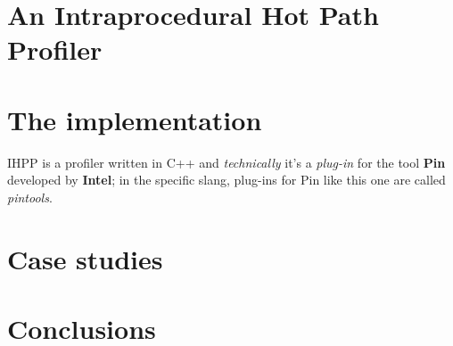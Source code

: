 \documentclass[a4paper,11pt]{report}
\begin{document}
\chapter{An Intraprocedural Hot Path Profiler}

\chapter{The implementation}

IHPP is a profiler written in C++ and \emph{technically} it's a \emph{plug-in}
for the tool \textbf{Pin} developed by \textbf{Intel}; in the specific slang,
plug-ins for Pin like this one are called \emph{pintools}.

\chapter{Case studies}


\chapter{Conclusions}

{}

\end{document}
